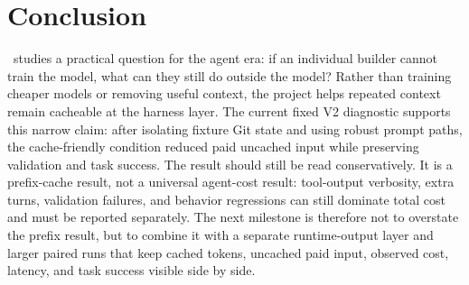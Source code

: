 \section{Conclusion}
\label{sec:conclusion}

\toolname\ studies a practical question for the agent era: if an individual builder cannot train the model, what can they still do outside the model? Rather than training cheaper models or removing useful context, the project helps repeated context remain cacheable at the harness layer. The current fixed V2 diagnostic supports this narrow claim: after isolating fixture Git state and using robust prompt paths, the cache-friendly condition reduced paid uncached input while preserving validation and task success. The result should still be read conservatively. It is a prefix-cache result, not a universal agent-cost result: tool-output verbosity, extra turns, validation failures, and behavior regressions can still dominate total cost and must be reported separately. The next milestone is therefore not to overstate the prefix result, but to combine it with a separate runtime-output layer and larger paired runs that keep cached tokens, uncached paid input, observed cost, latency, and task success visible side by side.
